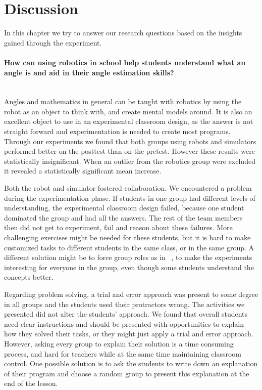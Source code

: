 \section{Discussion}
In this chapter we try to answer our research questions based on the insights gained through the experiment. 

\paragraph{How can using robotics in school help students understand what an angle is and aid in their angle estimation skills?}~\\
Angles and mathematics in general can be taught with robotics by using the robot as an object to think with, and create mental models around. It is also an excellent object to use in an experimental classroom design, as the answer is not straight forward and experimentation is needed to create most programs. Through our experiments we found that both groups using robots and simulators performed better on the posttest than on the pretest. However these results were statistically insignificant. When an outlier from the robotics group were excluded it revealed a statistically significant mean increase. 

\bigskip\noindent
Both the robot and simulator fostered collaboration. We encountered a problem during the experimentation phase. If students in one group had different levels of understanding, the experimental classroom design failed, because one student dominated the group and had all the answers. The rest of the team members then did not get to experiment, fail and reason about these failures. More challenging exercises might be needed for these students, but it is hard to make customized tasks to different students in the same class, or in the same group. A different solution might be to force group roles as in ~\cite{mitnik2009collaborative}, to make the experiments interesting for everyone in the group, even though some students understand the concepts better.

\bigskip\noindent
Regarding problem solving, a trial and error approach was present to some degree in all groups and the students used their protractors wrong. The activities we presented did not alter the students' approach. We found that overall students need clear instructions and should be presented with opportunities to explain how they solved their tasks, or they might just apply a trial and error approach. However, asking every group to explain their solution is a time consuming process, and hard for teachers while at the same time maintaining classroom control. One possible solution is to ask the students to write down an explanation of their program and choose a random group to present this explanation at the end of the lesson.

